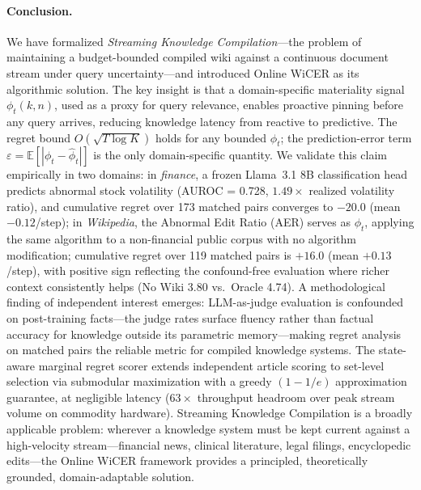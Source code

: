 \documentclass{article}
\begin{document}
\paragraph{Conclusion.}
We have formalized \emph{Streaming Knowledge Compilation}---the problem of maintaining a budget-bounded compiled wiki against a continuous document stream under query uncertainty---and introduced Online WiCER as its algorithmic solution.
The key insight is that a domain-specific materiality signal $\phi_t(k,n)$, used as a proxy for query relevance, enables proactive pinning before any query arrives, reducing knowledge latency from reactive to predictive.
The regret bound $O(\sqrt{T\log K})$ holds for any bounded $\phi_t$; the prediction-error term $\varepsilon = \mathbb{E}[|\phi_t - \hat{\phi}_t|]$ is the only domain-specific quantity.
We validate this claim empirically in two domains:
in \emph{finance}, a frozen Llama~3.1 8B classification head predicts abnormal stock volatility (AUROC = 0.728, $1.49\times$ realized volatility ratio), and cumulative regret over 173 matched pairs converges to $-20.0$ (mean $-0.12$/step);
in \emph{Wikipedia}, the Abnormal Edit Ratio (AER) serves as $\phi_t$, applying the same algorithm to a non-financial public corpus with no algorithm modification; cumulative regret over 119 matched pairs is $+16.0$ (mean $+0.13$/step), with positive sign reflecting the confound-free evaluation where richer context consistently helps (No Wiki 3.80 vs.\ Oracle 4.74).
A methodological finding of independent interest emerges: LLM-as-judge evaluation is confounded on post-training facts---the judge rates surface fluency rather than factual accuracy for knowledge outside its parametric memory---making regret analysis on matched pairs the reliable metric for compiled knowledge systems.
The state-aware marginal regret scorer extends independent article scoring to set-level selection via submodular maximization with a greedy $(1-1/e)$ approximation guarantee, at negligible latency ($63\times$ throughput headroom over peak stream volume on commodity hardware).
Streaming Knowledge Compilation is a broadly applicable problem: wherever a knowledge system must be kept current against a high-velocity stream---financial news, clinical literature, legal filings, encyclopedic edits---the Online WiCER framework provides a principled, theoretically grounded, domain-adaptable solution.

\end{document}
